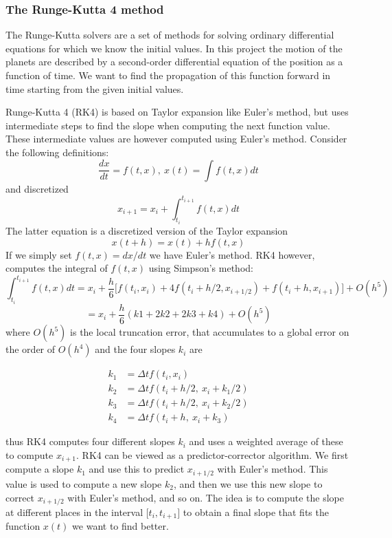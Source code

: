 \documentclass[a4paper,12pt, english]{article}
\begin{document}
 
\subsubsection*{The Runge-Kutta 4 method}

The Runge-Kutta solvers are a set of methods for solving ordinary differential equations for which we know the initial values. In this project the motion of the planets are described by a second-order differential equation of the position as a function of time. We want to find the propagation of this function forward in time starting from the given initial values.

Runge-Kutta 4 (RK4) is based on Taylor expansion like Euler's method, but uses intermediate steps to find the slope when computing the next function value. These intermediate values are however computed using Euler's method. Consider the following definitions:
\[
\frac{dx}{dt}=f(t,x), \ x(t)=\int f(t,x)dt
\]
and discretized
\[
x_{i+1} = x_i + \int_{t_i}^{t_{i+1}}f(t,x)dt
\]
The latter equation is a discretized version of the Taylor expansion
\[
x(t+h) = x(t) + hf(t,x)
\]
If we simply set $f(t,x) = dx/dt$ we have Euler's method. RK4 however, computes the integral of $f(t,x)$ using Simpson's method:
\[
\int_{t_i}^{t_{i+1}}f(t,x)dt = x_i + \frac{h}{6} \lbrack f(t_i,x_i) + 4f(t_i+h/2,x_{i+1/2}) +
f(t_i+h,x_{i+1}) \rbrack + O(h^5)
\]
\[
= x_i + \frac{h}{6} (k1 + 2k2 + 2k3 + k4) + O(h^5)
\]
where $O(h^5)$ is the local truncation error, that accumulates to a global error on the order of $O(h^4)$ and the four slopes $k_i$ are

\begin{equation}
\begin{split}
k_1 &= \Delta t f(t_i,x_i) \\
k_2 &= \Delta t f(t_i + h/2, \ x_i + k_1/2) \\
k_3 &= \Delta t f(t_i + h/2, \ x_i + k_2/2) \\
k_4 &= \Delta t f(t_i + h, \ x_i + k_3)
\end{split}
\end{equation}

thus RK4 computes four different slopes $k_i$ and uses a weighted average of these to compute $x_{i+1}$. RK4 can be viewed as a predictor-corrector algorithm. We first compute a slope $k_1$ and use this to predict $x_{i+1/2}$ with Euler's method. This value is used to compute a new slope $k_2$, and then we use this new slope to correct $x_{i+1/2}$ with Euler's method, and so on. The idea is to compute the slope at different places in the interval $\lbrack t_i,t_{i+1} \rbrack$ to obtain a final slope that fits the function $x(t)$ we want to find better.
\end{document}
